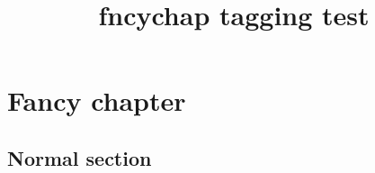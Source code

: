 \documentclass{report}
\title{fncychap tagging test}
\begin{document}
\tableofcontents

\chapter{Fancy chapter}

\section{Normal section}
\end{document}
